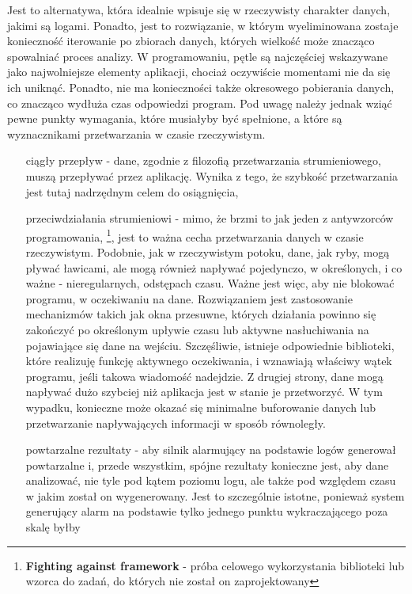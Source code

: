     Jest to alternatywa, która idealnie wpisuje się w rzeczywisty charakter danych, jakimi są logami. Ponadto, jest to rozwiązanie, w którym
    wyeliminowana zostaje konieczność iterowanie po zbiorach danych, których wielkość może znacząco spowalniać proces analizy. W programowaniu,
    pętle są najczęściej wskazywane jako najwolniejsze elementy aplikacji, chociaż oczywiście momentami nie da się ich uniknąć. Ponadto, nie ma 
    konieczności także okresowego pobierania danych, co znacząco wydłuża czas odpowiedzi program. Pod uwagę należy jednak wziąć pewne punkty wymagania,
    które musiałyby być spełnione, a które są wyznacznikami przetwarzania w czasie rzeczywistym.
    \begin{itemize}
        \item[ciągły przepływ] - dane, zgodnie z filozofią przetwarzania strumieniowego, muszą przepływać przez aplikację. Wynika z tego, że szybkość
        przetwarzania jest tutaj nadrzędnym celem do osiągnięcia,
        \item[przeciwdziałania strumieniowi] - mimo, że brzmi to jak jeden z antywzorców programowania,
        \footnote{\textbf{Fighting against framework} - próba celowego wykorzystania biblioteki lub wzorca do zadań, do których nie został on zaprojektowany},
        jest to ważna cecha przetwarzania danych w czasie rzeczywistym. Podobnie, jak w rzeczywistym potoku, dane, jak ryby, mogą pływać ławicami, ale mogą
        również napływać pojedynczo, w określonych, i co ważne - nieregularnych, odstępach czasu. Ważne jest więc, aby nie blokować programu, w oczekiwaniu
        na dane. Rozwiązaniem jest zastosowanie mechanizmów takich jak okna przesuwne, których działania powinno się zakończyć po określonym upływie czasu lub
        aktywne nasłuchiwania na pojawiające się dane na wejściu. Szczęśliwie, istnieje odpowiednie biblioteki, które realizuję funkcję aktywnego oczekiwania,
        i wznawiają właściwy wątek programu, jeśli takowa wiadomość nadejdzie. Z drugiej strony, dane mogą napływać dużo szybciej niż aplikacja jest w stanie
        je przetworzyć. W tym wypadku, konieczne może okazać się minimalne buforowanie danych lub przetwarzanie napływających informacji w sposób równoległy.
        \item[powtarzalne rezultaty] - aby silnik alarmujący na podstawie logów generował powtarzalne i, przede wszystkim, 
        spójne rezultaty konieczne jest, aby dane analizować, nie tyle pod kątem poziomu logu, ale także pod względem czasu w jakim został on wygenerowany. 
        Jest to szczególnie istotne, ponieważ system generujący alarm na podstawie tylko jednego punktu wykraczającego poza skalę byłby 

\end{itemize}
